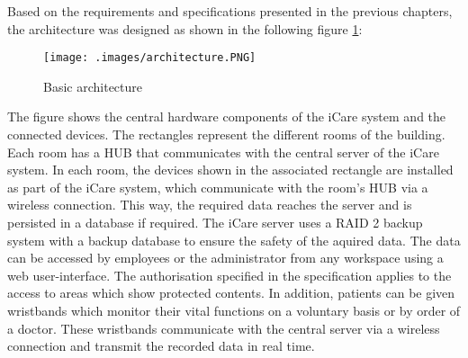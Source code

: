 Based on the requirements and specifications presented in the previous chapters, the architecture was designed as shown in the following figure \ref{architecure}:
\begin{figure}[H]
	\centering
	\texttt{[image: .images/architecture.PNG]}
	\caption{Basic architecture}
	\label{architecure}
\end{figure}
The figure shows the central hardware components of the iCare system and the connected devices. The rectangles represent the different rooms of the building. Each room has a HUB that communicates with the central server of the iCare system. In each room, the devices shown in the associated rectangle are installed as part of the iCare system, which communicate with the room's HUB via a wireless connection. This way, the required data reaches the server and is persisted in a database if required. The iCare server uses a RAID 2 backup system with a backup database to ensure the safety of the aquired data. The data can be accessed by employees or the administrator from any workspace using a web user-interface. The authorisation specified in the specification applies to the access to areas which show protected contents. In addition, patients can be given wristbands which monitor their vital functions on a voluntary basis or by order of a doctor. These wristbands communicate with the central server via a wireless connection and transmit the recorded data in real time.